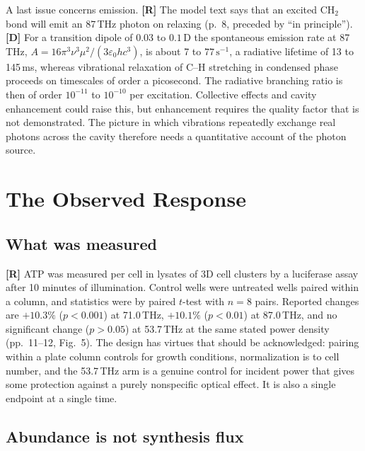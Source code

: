 \documentclass[11pt]{article}
\newcommand{\stR}{\textbf{\textcolor{blue!55!black}{[R]}}}
\newcommand{\stD}{\textbf{\textcolor{green!40!black}{[D]}}}
\theoremstyle{plain}
\theoremstyle{definition}
\theoremstyle{remark}
\begin{document}
A last issue concerns emission. \stR{} The model text says that an excited CH$_2$ bond will emit an 87\,THz photon on relaxing (p.~8, preceded by ``in principle''). \stD{} For a transition dipole of $0.03$ to $0.1$\,D the spontaneous emission rate at 87\,THz, $A=16\pi^3\nu^3\mu^2/(3\varepsilon_0hc^3)$, is about 7 to $77\,\mathrm{s^{-1}}$, a radiative lifetime of 13 to 145\,ms, whereas vibrational relaxation of C--H stretching in condensed phase proceeds on timescales of order a picosecond. The radiative branching ratio is then of order $10^{-11}$ to $10^{-10}$ per excitation. Collective effects and cavity enhancement could raise this, but enhancement requires the quality factor that is not demonstrated. The picture in which vibrations repeatedly exchange real photons across the cavity therefore needs a quantitative account of the photon source.

\section{The Observed Response}
\label{sec:atp}

\subsection{What was measured}

\stR{} ATP was measured per cell in lysates of 3D cell clusters by a luciferase assay after 10 minutes of illumination. Control wells were untreated wells paired within a column, and statistics were by paired $t$-test with $n=8$ pairs. Reported changes are $+10.3\%$ ($p<0.001$) at 71.0\,THz, $+10.1\%$ ($p<0.01$) at 87.0\,THz, and no significant change ($p>0.05$) at 53.7\,THz at the same stated power density (pp.~11--12, Fig.~5). The design has virtues that should be acknowledged: pairing within a plate column controls for growth conditions, normalization is to cell number, and the 53.7\,THz arm is a genuine control for incident power that gives some protection against a purely nonspecific optical effect. It is also a single endpoint at a single time.

\subsection{Abundance is not synthesis flux}
\end{document}

